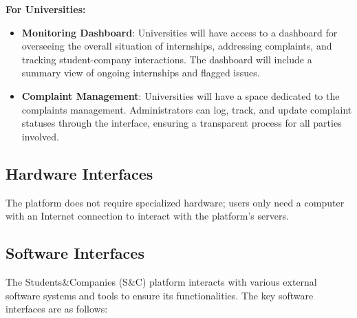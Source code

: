 \vspace{5mm}
\textbf{For Universities:}
\begin{itemize}
    \item \textbf{Monitoring Dashboard}: Universities will have access to a dashboard for overseeing the overall situation of internships, addressing complaints, and tracking student-company interactions. The dashboard will include a summary view of ongoing internships and flagged issues.
    \item \textbf{Complaint Management}: Universities will have a space dedicated to the complaints management. Administrators can log, track, and update complaint statuses through the interface, ensuring a transparent process for all parties involved.
\end{itemize}

\subsection{Hardware Interfaces}

The platform does not require specialized hardware; users only need a computer with an Internet connection to interact with the platform's servers.

\subsection{Software Interfaces}

The Students\&Companies (S\&C) platform interacts with various external software systems and tools to ensure its functionalities. The key software interfaces are as follows:

